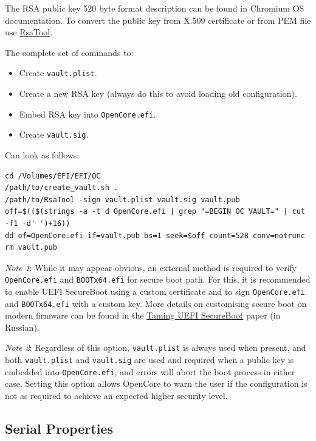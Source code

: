 \documentclass[]{article}
\providecommand{\tightlist}{%
  \setlength{\itemsep}{0pt}\setlength{\parskip}{0pt}}
\begin{document}
\begin{enumerate}
  The RSA public key 520 byte format description can be found in Chromium OS documentation.
  To convert the public key from X.509 certificate or from PEM file use
  \href{https://github.com/acidanthera/OpenCorePkg/tree/master/Utilities/CreateVault}{RsaTool}.


  The complete set of commands to:

  \begin{itemize}
  \tightlist
  \item Create \texttt{vault.plist}.
  \item Create a new RSA key (always do this to avoid loading old configuration).
  \item Embed RSA key into \texttt{OpenCore.efi}.
  \item Create \texttt{vault.sig}.
  \end{itemize}

  Can look as follows:
\begin{lstlisting}[label=createvault, style=ocbash]
cd /Volumes/EFI/EFI/OC
/path/to/create_vault.sh .
/path/to/RsaTool -sign vault.plist vault.sig vault.pub
off=$(($(strings -a -t d OpenCore.efi | grep "=BEGIN OC VAULT=" | cut -f1 -d' ')+16))
dd of=OpenCore.efi if=vault.pub bs=1 seek=$off count=528 conv=notrunc
rm vault.pub
\end{lstlisting}

  \emph{Note 1}: While it may appear obvious, an external
  method is required to verify \texttt{OpenCore.efi} and \texttt{BOOTx64.efi} for
  secure boot path. For this, it is recommended to enable UEFI SecureBoot
  using a custom certificate and to sign \texttt{OpenCore.efi} and \texttt{BOOTx64.efi}
  with a custom key. More details on customising secure boot on modern firmware
  can be found in the \href{https://habr.com/post/273497/}{Taming UEFI SecureBoot}
  paper (in Russian).

  \emph{Note 2}:  Regardless of this option, \texttt{vault.plist} is always used when
  present, and both \texttt{vault.plist} and \texttt{vault.sig} are used and required
  when a public key is embedded into \texttt{OpenCore.efi}, and errors will abort the
  boot process in either case. Setting this option allows OpenCore to warn the user if
  the configuration is not as required to achieve an expected higher security level.

\end{enumerate}

\subsection{Serial Properties}\label{miscserialprops}
\end{document}
